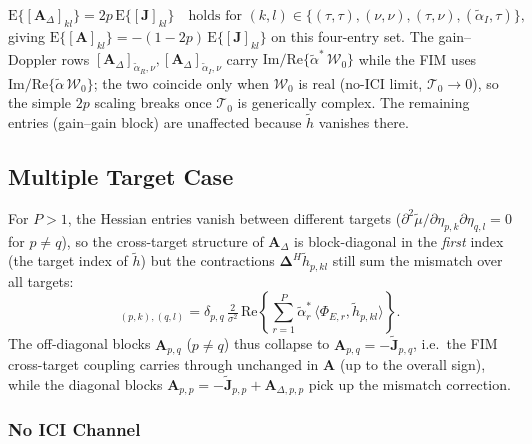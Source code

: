 \documentclass[11pt]{article}
\begin{document}
\begin{equation}
    \mathrm{E}\{[\bm{A}_\Delta]_{kl}\} = 2p\, \mathrm{E}\{[\bm{J}]_{kl}\} \quad \text{holds for } (k,l) \in \{(\tau,\tau), (\nu,\nu), (\tau,\nu), (\tilde{\alpha}_I, \tau)\},
\end{equation}
giving \(\mathrm{E}\{[\bm{A}]_{kl}\} = -(1-2p)\, \mathrm{E}\{[\bm{J}]_{kl}\}\) on this four-entry set. The gain--Doppler rows \([\bm{A}_\Delta]_{\tilde{\alpha}_R,\nu}, [\bm{A}_\Delta]_{\tilde{\alpha}_I,\nu}\) carry \(\mathrm{Im/Re}\{\tilde{\alpha}^*\,\mathcal{W}_0\}\) while the FIM uses \(\mathrm{Im/Re}\{\tilde{\alpha}\,\mathcal{W}_0\}\); the two coincide only when \(\mathcal{W}_0\) is real (no-ICI limit, \(\mathcal{T}_0 \to 0\)), so the simple \(2p\) scaling breaks once \(\mathcal{T}_0\) is generically complex. The remaining entries (gain--gain block) are unaffected because \(\tilde{h}\) vanishes there.

\subsection{Multiple Target Case}

For \(P > 1\), the Hessian entries vanish between different targets (\(\partial^2 \tilde{\mu} / \partial \eta_{p,k} \partial \eta_{q,l} = 0\) for \(p \neq q\)), so the cross-target structure of \(\bm{A}_\Delta\) is block-diagonal in the \emph{first} index (the target index of \(\tilde{h}\)) but the contractions \(\bm{\Delta}^H \tilde{h}_{p,kl}\) still sum the mismatch over all targets:
\begin{equation}
    [\bm{A}_\Delta]_{(p,k),(q,l)} = \delta_{p,q}\, \tfrac{2}{\sigma^2}\, \mathrm{Re}\!\left\{ \sum_{r=1}^{P} \tilde{\alpha}_r^*\, \langle \Phi_{E,r}, \tilde{h}_{p, kl} \rangle \right\}.
\end{equation}
The off-diagonal blocks \(\bm{A}_{p,q}\) (\(p \neq q\)) thus collapse to \(\bm{A}_{p,q} = -\tilde{\bm{J}}_{p,q}\), i.e.\ the FIM cross-target coupling carries through unchanged in \(\bm{A}\) (up to the overall sign), while the diagonal blocks \(\bm{A}_{p,p} = -\tilde{\bm{J}}_{p,p} + \bm{A}_{\Delta, p,p}\) pick up the mismatch correction.

\subsubsection{No ICI Channel}
\end{document}
